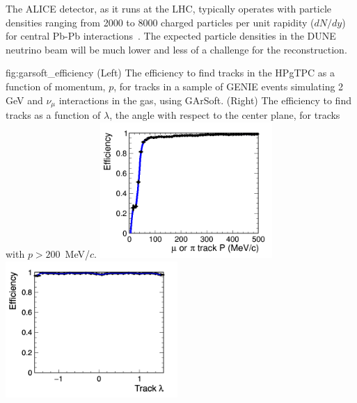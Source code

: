 The ALICE detector, as it runs at the LHC, typically operates with particle densities ranging from 2000 to 8000 charged particles per unit rapidity ($dN/dy$) for central Pb-Pb interactions~\cite{Cheshkov:2006ym}. The expected particle densities in the DUNE neutrino beam will be much lower and less of a challenge for the reconstruction. 

\begin{dunefigure}{fig:garsoft_efficiency}
{(Left) The efficiency to find tracks in the HPgTPC as a function of momentum, $p$, for tracks in a sample of GENIE events simulating 2 GeV and $\nu_\mu$ interactions in the gas, using GArSoft. (Right) The efficiency to find tracks as a function of $\lambda$, the angle with respect to the center plane, for tracks with $p>200$~MeV/$c$.}
    \includegraphics[width=0.49\textwidth]{graphics/effvsp.png}\includegraphics[width=0.49\textwidth]{graphics/effvslambdagt200MeV.png}
\end{dunefigure}

